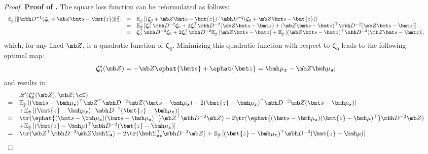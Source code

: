 \documentclass[mnsc, nonblindrev]{informswp}
\newcommand{\1}[1]{\mathds{1}{\left(#1\right)}}
\begin{document}
\begin{appendices}
\begin{proof}{\bf Proof of .}
The square loss function can be reformulated as follows:
\[
\begin{array}{rcl}
\mathbb{E}_{\hat{\mathbb{P}}}\,[\|\mbh D^{-1}(\bm \zeta_0 + \mb Z \bmt s - \bmt{z})\|^2_2] 
& = & \mathbb{E}_{\hat{\mathbb{P}}}\,[(\bm \zeta_0 + \mb Z \bmt s - \bmt{z})^{\top} \mbh D^{-2} (\bm \zeta_0 + \mb Z \bmt s - \bmt{z})] \\
& = & \mathbb{E}_{\hat{\mathbb{P}}}\,[\bm \zeta_0^\top \mbh D^{-2} \bm \zeta_0 + 2 \bm \zeta_0^{\top} \mbh D^{-2} (\mb Z \bmt s - \bmt z) + (\mb Z \bmt s - \bmt z)^{\top} \mbh D^{-2} (\mb Z \bmt s - \bmt z)] \\
& = & \bm \zeta_0^\top \mbh D^{-2} \bm \zeta_0 + 2 \bm \zeta_0^{\top} \mbh D^{-2} \mathbb{E}_{\hat{\mathbb{P}}}\,[\mb Z \bmt s - \bmt z] + \mathbb{E}_{\hat{\mathbb{P}}}\,[(\mb Z \bmt s - \bmt z)^{\top} \mbh D^{-2} (\mb Z \bmt s - \bmt z)],
\end{array}
\]
which, for any fixed $\mb Z$, is a quadratic function of $\bm \zeta_0$. Minimizing this quadratic function with respect to $\bm \zeta_0$ leads to the following optimal map:
$$
\bm \zeta_0^\star (\mb Z) = - \mb Z \ephat{\bmt s} + \ephat{\bmt z} = \bmh \mu_{\bm z} - \mb Z \bmh \mu_{\bm s};
$$ 
and results in:
\begin{equation}
\begin{array}{cl}
& \mathscr{L}(\bm \zeta_0^\star (\mb Z),\mb Z; \cD) \\
= & \mathbb{E}_{\hat{\mathbb{P}}}\,[(\bmt s - \bmh \mu_{\bm s} )^\top \mb Z^{\top} \mbh D^{-2} \mb Z (\bmt s - \bmh \mu_{\bm s} ) -2 ( \bmt{z} - \bmh \mu_{\bm z} )^\top \mbh D^{-2} \mb Z (\bmt s - \bmh \mu_{\bm s})] \\
  & + \mathbb{E}_{\hat{\mathbb{P}}}\,[(\bmt{z} - \bmh \mu_{\bm z} )^\top \mbh D^{-2} ( \bmt{z} - \bmh \mu_{\bm z})] \\
= & \tr(\ephat{(\bmt s - \bmh \mu_{\bm s})(\bmt s - \bmh \mu_{\bm s})^\top} \mb Z^{\top} \mbh D^{-2} \mb Z) - 2 \tr(\ephat{(\bmt s - \bmh \mu_{\bm s})(\bmt{z} - \bmh \mu )^\top}\mbh D^{-2} \mb Z) \\
  & + \mathbb{E}_{\hat{\mathbb{P}}}\,[(\bmt{z} - \bmh \mu)^\top \mbh D^{-2} (\bmt{z} - \bmh \mu_{\bm z})] \\
= & \tr(\mb Z^{\top} \mbh D^{-2} \mb Z \bmh \Sigma_{\bm s}) - 2 \tr(\bmh \Sigma_{\bm z \bm s}^\top \mbh D^{-2} \mb Z)  + \mathbb{E}_{\hat{\mathbb{P}}}\,[(\bmt{z} - \bmh \mu_{\bm z})^\top \mbh D^{-2}(\bmt{z} - \bmh \mu)].
\end{array}

\end{equation}
\end{proof}
\end{appendices}
\end{document}
